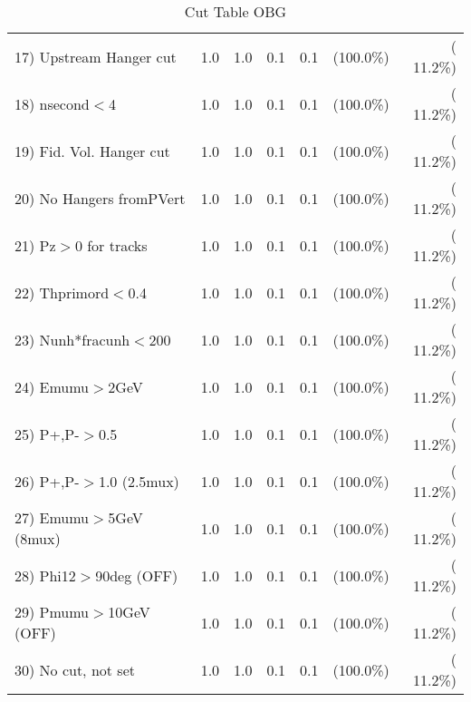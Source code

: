 \begin{table}[h!]
\begin{tabular}{||l||r|r|r|r|r|r||}
 17) Upstream Hanger cut  &          1.0 &          1.0 &          0.1 &          0.1 & (100.0\%) & ( 11.2\%) \\
 18) nsecond$<$4          &          1.0 &          1.0 &          0.1 &          0.1 & (100.0\%) & ( 11.2\%) \\
 19) Fid. Vol. Hanger cut &          1.0 &          1.0 &          0.1 &          0.1 & (100.0\%) & ( 11.2\%) \\
 20) No Hangers fromPVert &          1.0 &          1.0 &          0.1 &          0.1 & (100.0\%) & ( 11.2\%) \\
 21) Pz$>$0 for tracks    &          1.0 &          1.0 &          0.1 &          0.1 & (100.0\%) & ( 11.2\%) \\
 22) Thprimord$<$0.4      &          1.0 &          1.0 &          0.1 &          0.1 & (100.0\%) & ( 11.2\%) \\
 23) Nunh*fracunh$<$200   &          1.0 &          1.0 &          0.1 &          0.1 & (100.0\%) & ( 11.2\%) \\
 24) Emumu$>$2GeV         &          1.0 &          1.0 &          0.1 &          0.1 & (100.0\%) & ( 11.2\%) \\
 25) P+,P-$>$0.5          &          1.0 &          1.0 &          0.1 &          0.1 & (100.0\%) & ( 11.2\%) \\
 26) P+,P-$>$1.0 (2.5mux) &          1.0 &          1.0 &          0.1 &          0.1 & (100.0\%) & ( 11.2\%) \\
 27) Emumu$>$5GeV  (8mux) &          1.0 &          1.0 &          0.1 &          0.1 & (100.0\%) & ( 11.2\%) \\
 28) Phi12$>$90deg  (OFF) &          1.0 &          1.0 &          0.1 &          0.1 & (100.0\%) & ( 11.2\%) \\
 29) Pmumu$>$10GeV  (OFF) &          1.0 &          1.0 &          0.1 &          0.1 & (100.0\%) & ( 11.2\%) \\
 30) No cut, not set      &          1.0 &          1.0 &          0.1 &          0.1 & (100.0\%) & ( 11.2\%) \\
 \hline
 \hline
 \end{tabular}
 \caption{Cut Table  OBG      }
 \label{tab-cutcohjpsi-mumu_qe}
 \end{table}
